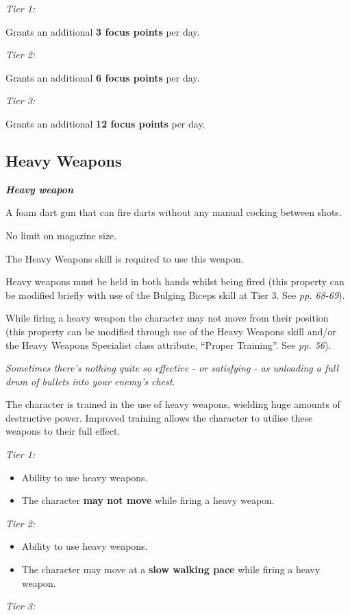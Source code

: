 \textit{Tier 1:}

Grants an additional \textbf{3 focus points} per day.

\textit{Tier 2:}

Grants an additional \textbf{6 focus points} per day.

\textit{Tier 3:}

Grants an additional \textbf{12 focus points} per day.

\subsection{Heavy Weapons}

\textbf{\textit{Heavy weapon}}

A foam dart gun that can fire darts without any manual cocking between shots.

No limit on magazine size.

The Heavy Weapons skill is required to use this weapon.

Heavy weapons must be held in both hands whilst being fired (this property can be modified briefly with use of the Bulging Biceps skill at Tier 3. See \textit{pp. 68-69}).

While firing a heavy weapon the character may not move from their position (this property can be modified through use of the Heavy Weapons skill and/or the Heavy Weapons Specialist class attribute, ``Proper Training''. See \textit{pp. 56}).

\textit{Sometimes there's nothing quite so effective - or satisfying - as unloading a full drum of bullets into your enemy's chest.}

The character is trained in the use of heavy weapons, wielding huge amounts of destructive power. Improved training allows the character to utilise these weapons to their full effect.

\textit{Tier 1:}

\begin{itemize}
\item Ability to use heavy weapons.

\item The character \textbf{may not move} while firing a heavy weapon.

\end{itemize}
\textit{Tier 2:}

\begin{itemize}
\item Ability to use heavy weapons.

\item The character may move at a \textbf{slow walking pace} while firing a heavy weapon.

\end{itemize}
\textit{Tier 3:}

